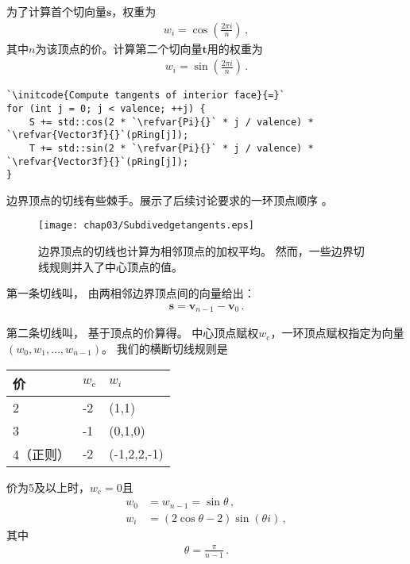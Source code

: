为了计算首个切向量$\bm s$，权重为
\begin{align*}
    w_i=\cos{\left(\frac{2\pi i}{n}\right)}\, ,
\end{align*}
其中$n$为该顶点的价。计算第二个切向量$\bm t$用的权重为
\begin{align*}
    w_i=\sin{\left(\frac{2\pi i}{n}\right)}\, .
\end{align*}

\begin{lstlisting}
`\initcode{Compute tangents of interior face}{=}`
for (int j = 0; j < valence; ++j) {
    S += std::cos(2 * `\refvar{Pi}{}` * j / valence) * `\refvar{Vector3f}{}`(pRing[j]);
    T += std::sin(2 * `\refvar{Pi}{}` * j / valence) * `\refvar{Vector3f}{}`(pRing[j]);
}
\end{lstlisting}

边界顶点的切线有些棘手。展示了后续讨论要求的一环顶点顺序
。
\begin{figure}[htbp]
    \centering\texttt{[image: chap03/Subdivedgetangents.eps]}
    \caption{边界顶点的切线也计算为相邻顶点的加权平均。
        然而，一些边界切线规则并入了中心顶点的值。}
    \label{fig:3.38}
\end{figure}

第一条切线叫，
由两相邻边界顶点间的向量给出：
\begin{align*}
    \bm s=\bm v_{n-1}-\bm v_0\, .
\end{align*}

第二条切线叫，
基于顶点的价算得。
中心顶点赋权$w_{\mathrm{c}}$，一环顶点赋权指定为向量$(w_0,w_1,\ldots,w_{n-1})$。
我们的横断切线规则是
\begin{table}[h]
    \centering\begin{tabular}{lll}
        \toprule
        价        & $w_{\mathrm{c}}$ & $w_i$       \\
        \midrule
        2         & -2               & (1,1)       \\
        3         & -1               & (0,1,0)     \\
        4（正则） & -2               & (-1,2,2,-1) \\
        \bottomrule
    \end{tabular}
\end{table}

价为5及以上时，$w_{\mathrm{c}}=0$且
\begin{align*}
    w_0 & =w_{n-1}=\sin{\theta}\, ,              \\
    w_i & =(2\cos{\theta}-2)\sin{(\theta i)}\, ,
\end{align*}
其中
\begin{align*}
    \theta=\frac{\pi}{n-1}\, .
\end{align*}

